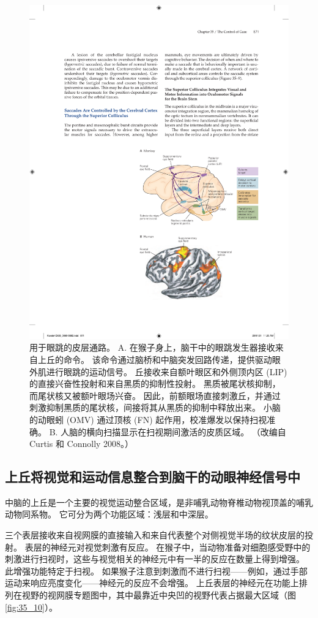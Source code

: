 \begin{figure}[htbp]
	\centering
	\includegraphics[width=0.6\linewidth]{chap35/fig_35_9}
	\caption{用于眼跳的皮层通路。 A. 在猴子身上，脑干中的眼跳发生器接收来自上丘的命令。 该命令通过脑桥和中脑突发回路传递，提供驱动眼外肌进行眼跳的运动信号。 丘接收来自额叶眼区和外侧顶内区 (LIP) 的直接兴奋性投射和来自黑质的抑制性投射。 黑质被尾状核抑制，而尾状核又被额叶眼场兴奋。 因此，前额眼场直接刺激丘，并通过刺激抑制黑质的尾状核，间接将其从黑质的抑制中释放出来。 小脑的动眼蚓 (OMV) 通过顶核 (FN) 起作用，校准爆发以保持扫视准确。 B. 人脑的横向扫描显示在扫视期间激活的皮质区域。 （改编自 Curtis 和 Connolly 2008。）}
	\label{fig:35_9}
\end{figure}


\subsection{上丘将视觉和运动信息整合到脑干的动眼神经信号中}
中脑的上丘是一个主要的视觉运动整合区域，是非哺乳动物脊椎动物视顶盖的哺乳动物同系物。 它可分为两个功能区域：浅层和中深层。

三个表层接收来自视网膜的直接输入和来自代表整个对侧视觉半场的纹状皮层的投射。 表层的神经元对视觉刺激有反应。 在猴子中，当动物准备对细胞感受野中的刺激进行扫视时，这些与视觉相关的神经元中有一半的反应在数量上得到增强。 此增强功能特定于扫视。 如果猴子注意到刺激而不进行扫视——例如，通过手部运动来响应亮度变化——神经元的反应不会增强。 
上丘表层的神经元在功能上排列在视野的视网膜专题图中，其中最靠近中央凹的视野代表占据最大区域（图 \ref{fig:35_10}）。


